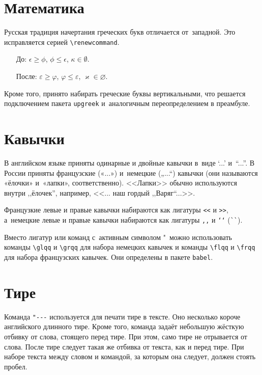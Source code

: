 \section{Математика}

Русская традиция начертания греческих букв отличается от~западной. Это исправляется серией \verb|\renewcommand|.
\begin{itemize}
    \item[До:] $ \epsilon \ge \phi$, $\phi \leq \epsilon$, $\kappa \in \emptyset$.
    \renewcommand{\epsilon}{\ensuremath{\varepsilon}}
    \renewcommand{\phi}{\ensuremath{\varphi}}
    \renewcommand{\kappa}{\ensuremath{\varkappa}}
    \renewcommand{\le}{\ensuremath{\leqslant}}
    \renewcommand{\leq}{\ensuremath{\leqslant}}
    \renewcommand{\ge}{\ensuremath{\geqslant}}
    \renewcommand{\geq}{\ensuremath{\geqslant}}
    \renewcommand{\emptyset}{\varnothing}
    \item[После:] $\epsilon \ge \phi$, $\phi \leq \epsilon$, $\kappa \in \emptyset$.
\end{itemize}

Кроме того, принято набирать греческие буквы вертикальными, что решается подключением пакета \verb|upgreek| и~аналогичным переопределением в преамбуле.


\section{Кавычки}
В английском языке приняты одинарные и двойные кавычки в~виде ‘...’ и~“...”. В России приняты французские («...») и~немецкие („...“) кавычки (они называются «ёлочки» и~«лапки», соответственно). <<Лапки>> обычно используются внутри ,,ёлочек'', например, <<... наш гордый ,,Варяг``...>>.

Французкие левые и правые кавычки набираются
как лигатуры \verb|<<| и \verb|>>|, а~немецкие левые и правые кавычки набираются как лигатуры \verb|,,| и \verb|‘‘| (\verb|``|).

Вместо лигатур или команд с~активным символом "\ можно использовать команды \verb|\glqq| и \verb|\grqq| для набора немецких кавычек и команды \verb|\flqq| и \verb|\frqq| для набора французских кавычек. Они определены в пакете \verb|babel|.

\section{Тире}
Команда \verb|"---| используется для печати тире в тексте. Оно несколько короче английского длинного тире. Кроме того, команда задаёт небольшую жёсткую отбивку от слова, стоящего перед тире. При этом, само тире не отрывается от слова. После тире следует такая же отбивка от текста, как и перед тире. При наборе текста между словом и командой, за которым она следует, должен стоять пробел.

